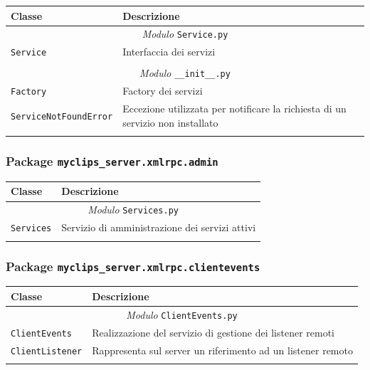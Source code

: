 \begin{longtable}{p{5.5cm}p{6.5cm}}
\hline 
\textbf{Classe} & \textbf{Descrizione} \\ 
\hline\hline 
\endhead

\multicolumn{2}{c}{\emph{Modulo} \texttt{Service.py}}\\
	\hdashline[5pt/5pt]
		\texttt{Service} & Interfaccia dei servizi \\ 
	\hline\\
	
\multicolumn{2}{c}{\emph{Modulo} \texttt{\_\_init\_\_.py}}\\
	\hdashline[5pt/5pt]
		\texttt{Factory} & Factory dei servizi \\ 
	\hdashline[1pt/5pt]
		\texttt{ServiceNotFoundError} & Eccezione utilizzata per notificare la richiesta di un servizio non installato \\ 
	\hline\\


\end{longtable}

\subsubsection{Package \texttt{myclips\_server.xmlrpc.admin}}

\begin{longtable}{p{5.5cm}p{6.5cm}}
\hline 
\textbf{Classe} & \textbf{Descrizione} \\ 
\hline\hline 
\endhead

\multicolumn{2}{c}{\emph{Modulo} \texttt{Services.py}}\\
	\hdashline[5pt/5pt]
		\texttt{Services} & Servizio di amministrazione dei servizi attivi \\ 
	\hline\\


\end{longtable}


\subsubsection{Package \texttt{myclips\_server.xmlrpc.clientevents}}

\begin{longtable}{p{5.5cm}p{6.5cm}}
\hline 
\textbf{Classe} & \textbf{Descrizione} \\ 
\hline\hline 
\endhead

\multicolumn{2}{c}{\emph{Modulo} \texttt{ClientEvents.py}}\\
	\hdashline[5pt/5pt]
		\texttt{ClientEvents} & Realizzazione del servizio di gestione dei listener remoti \\ 
	\hdashline[1pt/5pt]
		\texttt{ClientListener} & Rappresenta sul server un riferimento ad un listener remoto \\ 
	\hline\\

\end{longtable}

